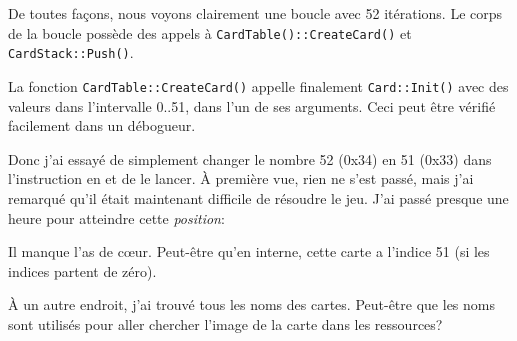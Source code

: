 De toutes façons, nous voyons clairement une boucle avec 52 itérations.
Le corps de la boucle possède des appels à \verb|CardTable()::CreateCard()| et
\verb|CardStack::Push()|.

La fonction \verb|CardTable::CreateCard()| appelle finalement \verb|Card::Init()|
avec des valeurs dans l'intervalle 0..51, dans l'un de ses arguments.
Ceci peut être vérifié facilement dans un débogueur.

Donc j'ai essayé de simplement changer le nombre 52 (0x34) en 51 (0x33) dans l'instruction
 en  et de le lancer.
À première vue, rien ne s'est passé, mais j'ai remarqué qu'il était maintenant
difficile de résoudre le jeu.
J'ai passé presque une heure pour atteindre cette \textit{position}:

\begin{figure}[H]
\centering
{}
\end{figure}

Il manque l'as de c\oe{}ur. Peut-être qu'en interne, cette carte a l'indice 51
(si les indices partent de zéro).

À un autre endroit, j'ai trouvé tous les noms des cartes. Peut-être que les noms
sont utilisés pour aller chercher l'image de la carte dans les ressources?

